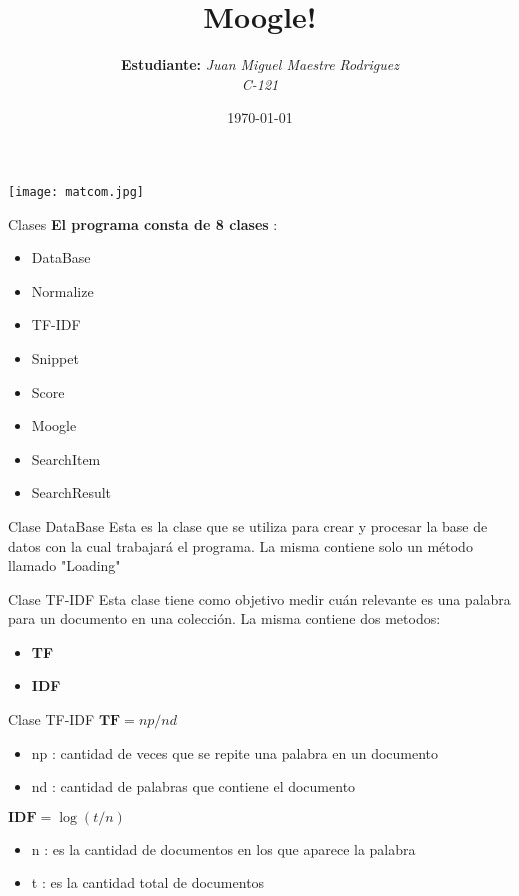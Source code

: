 \documentclass [12pt]{beamer}
\institute[MATCOM]{\large "Facultad de Matemática y Computación"}
\author[Juan Miguel Maestre Rodriguez]{\textbf{Estudiante:}\textit{ Juan Miguel Maestre Rodriguez \\ C-121}}
\date{\today}
\title{\textbf{Moogle!}}
\begin{document}
\begin{frame}
\maketitle   

\begin{center}
   \texttt{[image: matcom.jpg]}
\end{center}

\thispagestyle{empty}

\end{frame}

\begin{frame}{Clases}
\textbf{El programa consta de 8 clases} :
\begin{itemize}
\item DataBase
\item Normalize
\item TF-IDF
\item Snippet
\item Score
\item Moogle
\item SearchItem
\item SearchResult
\end{itemize}
\end{frame}

\begin{frame}{Clase DataBase}
Esta es la clase que se utiliza para crear y procesar la base de datos con la cual trabajará el programa.
La misma contiene solo un método llamado "Loading"
\end{frame}

\begin{frame}{Clase TF-IDF}
Esta clase tiene como objetivo medir cuán relevante es una palabra para un
documento en una colección. La misma contiene dos metodos: 
\begin{itemize}
    \item \textbf{TF}
    \item \textbf{IDF}
\end{itemize}
\end{frame}

\begin{frame}{Clase TF-IDF}
    $\textbf{TF} = np / nd$

    \begin{itemize}
        \item np : cantidad de veces que se repite una palabra en un documento 
        \item nd : cantidad de palabras que contiene el documento
    \end{itemize}
    


    $\textbf{IDF} = \log (t/n)$
    \begin{itemize}
        \item n : es la cantidad de documentos en los que aparece la palabra
        \item t : es la cantidad total de documentos
    \end{itemize}

\end{frame}
\end{document}
